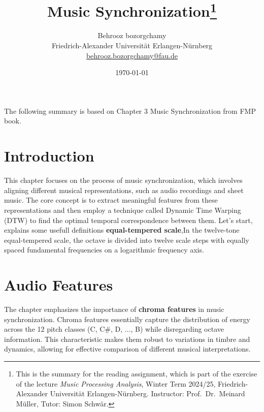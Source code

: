 \documentclass[a4paper, 9pt, twocolumn]{extarticle}
\begin{document}
\date{\normalsize \today}

\title{\vspace{-8mm}\textbf{\Large
    Music Synchronization\footnote{This is the summary for the reading assignment,
      which is part of the exercise of the lecture \emph{Music Processing Analysis}, Winter Term 2024/25,
      Friedrich-Alexander Universit\"at Erlangen-N\"urnberg.
      Instructor: Prof.\ Dr.\ Meinard M\"uller,
      Tutor: Simon Schw\"ar.
    }}}

\author{
  {
      \begin{minipage}{\textwidth}
        \center
        Behrooz bozorgchamy\\
        \small
        Friedrich-Alexander Universit\"at Erlangen-N\"urnberg
        \protect\\{} %
        \url{behrooz.bozorgchamy@fau.de}
      \end{minipage}
    }
}

\maketitle
\thispagestyle{empty}
The following summary is based on Chapter 3 Music Synchronization from FMP book\cite{Mueller21_FMP_SPRINGER}.
\section{Introduction}
\label{section:introduction}

This chapter focuses on the process of music synchronization, which
involves aligning different musical representations, such as audio
recordings and sheet music. The core concept is to extract meaningful
features from these representations and then employ a technique called
Dynamic Time Warping (DTW) to find the optimal temporal correspondence
between them. Let's start, explains some usefull definitions 
\textbf{equal-tempered scale},In the twelve-tone equal-tempered scale,
the octave is divided into twelve scale steps with equally spaced
fundamental frequencies on a logarithmic frequency axis.

\section{Audio Features}
\label{section:Audio Features}
The chapter emphasizes the importance of \textbf{chroma features} in music
synchronization. Chroma features essentially capture the distribution of
energy across the 12 pitch classes (C, C\#, D, ..., B) while
disregarding octave information. This characteristic makes them robust
to variations in timbre and dynamics, allowing for effective comparison
of different musical interpretations.
\end{document}
